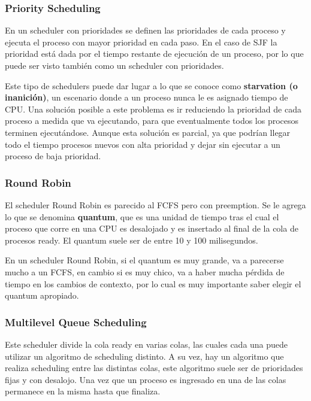 \documentclass{article}
\begin{document}
\subsubsection{Priority Scheduling}

En un scheduler con prioridades se definen las prioridades de cada proceso y ejecuta el proceso con mayor prioridad en cada paso. En el caso de SJF la prioridad est\'a dada por el tiempo restante de ejecuci\'on de un proceso, por lo que puede ser visto tambi\'en como un scheduler con prioridades.

Este tipo de schedulers puede dar lugar a lo que se conoce como \textbf{starvation (o inanici\'on)}, un escenario donde a un proceso nunca le es asignado tiempo de CPU. Una soluci\'on posible a este problema es ir reduciendo la prioridad de cada proceso a medida que va ejecutando, para que eventualmente todos los procesos terminen ejecut\'andose. Aunque esta soluci\'on es parcial, ya que podr\'ian llegar todo el tiempo procesos nuevos con alta prioridad y dejar sin ejecutar a un proceso de baja prioridad.

\subsubsection{Round Robin}

El scheduler Round Robin es parecido al FCFS pero con preemption. Se le agrega lo que se denomina \textbf{quantum}, que es una unidad de tiempo tras el cual el proceso que corre en una CPU es desalojado y es insertado al final de la cola de procesos ready. El quantum suele ser de entre 10 y 100 milisegundos.

En un scheduler Round Robin, si el quantum es muy grande, va a parecerse mucho a un FCFS, en cambio si es muy chico, va a haber mucha p\'erdida de tiempo en los cambios de contexto, por lo cual es muy importante saber elegir el quantum apropiado.

\subsubsection{Multilevel Queue Scheduling}
Este scheduler divide la cola ready en varias colas, las cuales cada una puede utilizar un algoritmo de scheduling distinto. A su vez, hay un algoritmo que realiza scheduling entre las distintas colas, este algoritmo suele ser de prioridades fijas y con desalojo. Una vez que un proceso es ingresado en una de las colas permanece en la misma hasta que finaliza. 
\end{document}
